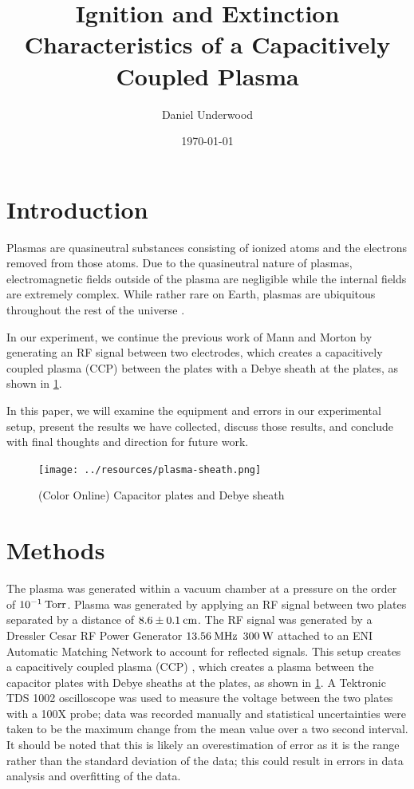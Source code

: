 \documentclass[reprint]{revtex4-1}
\begin{document}
\title{Ignition and Extinction Characteristics of a Capacitively Coupled Plasma}
\author{Daniel Underwood}
\date{\today}

\begin{abstract}

\end{abstract}
\maketitle

\section{Introduction}
Plasmas are quasineutral substances consisting of ionized atoms and the electrons removed from those atoms. Due to the quasineutral nature of plasmas, electromagnetic fields outside of the plasma are negligible while the internal fields are extremely complex. While rather rare on Earth, plasmas are ubiquitous throughout the rest of the universe \cite{F.F.Chen1989}.

In our experiment, we continue the previous work of Mann and Morton \cite{Mann2015} by generating an RF signal between two electrodes, which creates a capacitively coupled plasma (CCP) between the plates with a Debye sheath at the plates, as shown in \cref{fig:plasma-sheath}.

In this paper, we will examine the equipment and errors in our experimental setup, present the results we have collected, discuss those results, and conclude with final thoughts and direction for future work.

\begin{figure}[h]
\texttt{[image: ../resources/plasma-sheath.png]}
\caption{(Color Online) Capacitor plates and Debye sheath}
\label{fig:plasma-sheath}
\end{figure}

\section{Methods}

The plasma was generated within a vacuum chamber at a pressure on the order of $10^{-1}\:\rm{Torr}$. Plasma was generated by applying an RF signal between two plates separated by a distance of $8.6 \pm 0.1\:\rm{cm}$. The RF signal was generated by a Dressler Cesar RF Power Generator $13.56\:\rm{MHz}$ $300\:\rm{W}$ attached to an ENI Automatic Matching Network to account for reflected signals. This setup creates a capacitively coupled plasma (CCP) \cite{physics-radio-frequency}, which creates a plasma between the capacitor plates with Debye sheaths at the plates, as shown in \cref{fig:plasma-sheath}.  A Tektronic TDS 1002 oscilloscope was used to measure the voltage between the two plates with a 100X probe; data was recorded manually and statistical uncertainties were taken to be the maximum change from the mean value over a two second interval. It should be noted that this is likely an overestimation of error as it is the range rather than the standard deviation of the data; this could result in errors in data analysis and overfitting of the data.
\end{document}
